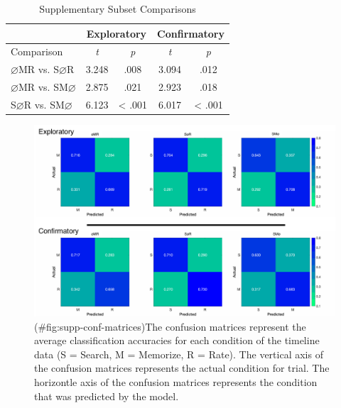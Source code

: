 \begin{appendix}
\begin{table}[!h]
    \centering
    \caption{Supplementary Subset Comparisons}
    \label{tab:supp-comparisons}
    \begin{tabular}{l c c c c}
         & \multicolumn{2}{c}{Exploratory} & \multicolumn{2}{c}{Confirmatory} \\
        \hline
        Comparison & \textit{t} & \multicolumn{1}{c|}{\textit{p}} & \textit{t} & \textit{p} \\
        \hline
        $\varnothing$MR vs. S$\varnothing$R & 3.248 & \multicolumn{1}{c|}{.008} & 3.094 & .012 \\
        $\varnothing$MR vs. SM$\varnothing$ & 2.875 & \multicolumn{1}{c|}{.021} & 2.923 & .018 \\
        S$\varnothing$R vs. SM$\varnothing$ & 6.123 & \multicolumn{1}{c|}{< .001} & 6.017 & < .001 \\
        \hline
    \end{tabular}
\end{table}

\begin{figure}
\centering
\includegraphics{supplementary_analysis/confusion_matrices/supp_conf_matrices.pdf}
\caption{(\#fig:supp-conf-matrices)The confusion matrices represent the
average classification accuracies for each condition of the timeline
data (S = Search, M = Memorize, R = Rate). The vertical axis of the
confusion matrices represents the actual condition for trial. The
horizontle axis of the confusion matrices represents the condition that
was predicted by the model.}
\end{figure}
\end{appendix}
